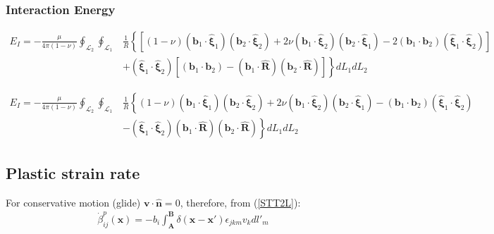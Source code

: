 \subsubsection{Interaction Energy}

\begin{align}
E_I=-\frac{\mu}{4\pi(1-\nu)}\oint_{\mathcal{L}_{2}}\oint_{\mathcal{L}_{1}}&\frac{1}{R}\left\{\left[(1-\nu)\left(\bm b_{1}\cdot\hat{\bm \xi}_1\right)\left(\bm b_{2}\cdot\hat{\bm \xi}_{2}\right)
+2\nu\left( \bm b_1\cdot\hat{\bm \xi}_2\right)\left(\bm b_2\cdot\hat{\bm \xi}_1\right)
-2\left(\bm b_1\cdot{\bm b}_2\right)\left( \hat{\bm\xi}_1\cdot\hat{\bm \xi}_2\right)
\right]\right.\nonumber\\
&\left.+\left( \hat{\bm\xi}_1\cdot\hat{\bm \xi}_2\right) \left[\left(\bm b_1\cdot\bm b_2\right)-\left(\bm b_1\cdot\hat{\bm R}\right)\left(\bm b_2\cdot\hat{\bm R}\right)\right]\right\} dL_{1} dL_{2}
\label{interaction_energy_loop_vector}
\end{align}

\begin{align}
E_I=-\frac{\mu}{4\pi(1-\nu)}\oint_{\mathcal{L}_{2}}\oint_{\mathcal{L}_{1}}&\frac{1}{R}\left\{(1-\nu)\left(\bm b_{1}\cdot\hat{\bm \xi}_1\right)\left(\bm b_{2}\cdot\hat{\bm \xi}_{2}\right)
+2\nu\left( \bm b_1\cdot\hat{\bm \xi}_2\right)\left(\bm b_2\cdot\hat{\bm \xi}_1\right)
-\left(\bm b_1\cdot{\bm b}_2\right)\left( \hat{\bm\xi}_1\cdot\hat{\bm \xi}_2\right)
\right.\nonumber\\
&\left. -\left( \hat{\bm\xi}_1\cdot\hat{\bm \xi}_2\right)\left(\bm b_1\cdot\hat{\bm R}\right)\left(\bm b_2\cdot\hat{\bm R}\right)\right\} dL_{1} dL_{2}
\label{interaction_energy_loop_vector}
\end{align}










\subsection{Plastic strain rate}

For conservative motion (glide) $\bm v\cdot\hat{\bm n}=0$, therefore, from (\ref{STT2L}):
\begin{align}
\dot\beta^p_{ij}(\bm x)=-b_i\int_{\bm A}^{\bm B}\delta(\bm x-\bm x')\epsilon_{jkm}v_kdl'_m
\end{align}







